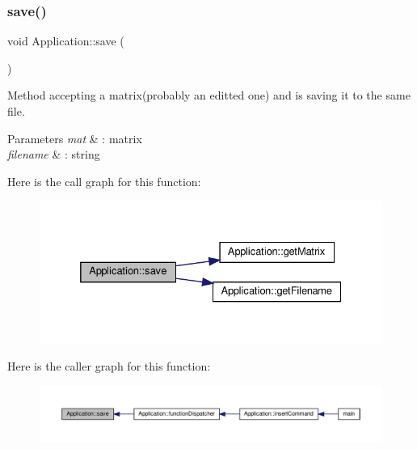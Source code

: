 \subsubsection{\texorpdfstring{save()}{save()}}
{\footnotesize\ttfamily void Application\+::save (\begin{DoxyParamCaption}{ }\end{DoxyParamCaption})\hspace{0.3cm}{\ttfamily [private]}}

Method accepting a matrix(probably an editted one) and is saving it to the same file. 
\begin{DoxyParams}{Parameters}
{\em mat} & \+: matrix \\
\hline
{\em filename} & \+: string \\
\hline
\end{DoxyParams}
Here is the call graph for this function\+:
\nopagebreak
\begin{figure}[H]
\begin{center}
\leavevmode
\includegraphics[width=332pt]{class_application_a2cbf94e01d55a814de35f90f4d874647_cgraph}
\end{center}
\end{figure}
Here is the caller graph for this function\+:
\nopagebreak
\begin{figure}[H]
\begin{center}
\leavevmode
\includegraphics[width=350pt]{class_application_a2cbf94e01d55a814de35f90f4d874647_icgraph}
\end{center}
\end{figure}
\mbox{\label{class_application_a10d5a48c95593cee25c1b9e0e257b5a7}} 
